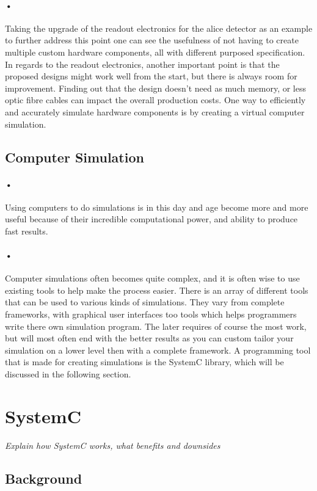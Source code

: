 \documentclass[a4paper]{report}
\begin{document}
\paragraph{•}
Taking the upgrade of the readout electronics for the \gls{alice} detector as an example to further address this point one can see the usefulness of not having to create multiple custom hardware components, all with different purposed specification.
In regards to the readout electronics, another important point is that the proposed designs might work well from the start, but there is always room for improvement. 
Finding out that the design doesn't need as much memory, or less optic fibre cables can impact the overall production costs.
One way to efficiently and accurately simulate hardware components is by creating a virtual computer simulation.

\subsection{Computer Simulation}
\paragraph{•}
Using computers to do simulations is in this day and age become more and more useful because of their incredible computational power, and ability to produce fast results.
\paragraph{•}
Computer simulations often becomes quite complex, and it is often wise to use existing tools to help make the process easier.
There is an array of different tools that can be used to various kinds of simulations.
They vary from complete frameworks, with graphical user interfaces too tools which helps programmers write there own simulation program.
The later requires of course the most work, but will most often end with the better results as you can custom tailor your simulation on a lower level then with a complete framework.
A programming tool that is made for creating simulations is the SystemC library, which will be discussed in the following section.

\section{SystemC}
\textit{Explain how SystemC works, what benefits and downsides}

\subsection{Background}
\end{document}
